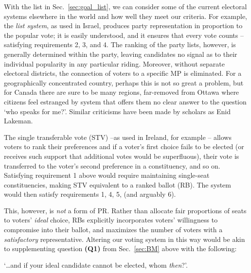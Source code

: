 With the list in Sec.~\ref{sec:goal_list}, we can consider some of the current electoral systems elsewhere in the world and how well they meet our criteria. For example, the \emph{list system}, as used in Israel, produces party representation in proportion to the popular vote; it is easily understood, and it ensures that every vote counts \---satisfying requirements 2, 3, and 4.
The ranking of the party lists, however, is generally determined within the party, leaving candidates no signal as to their individual popularity in any particular riding. Moreover, without separate electoral districts, the connection of voters to a specific MP is eliminated.
For a geographically concentrated country, perhaps this is not so great a problem, but for Canada there are sure to be many regions, far-removed from Ottawa where citizens feel estranged by system that offers them no clear answer to the question `who speaks for me?'. Similar criticisms have been made by scholars as Enid Lakeman\cite{Lakeman}.

The single transferable vote (STV) \---as used in Ireland, for example\cite{Irish_howto_vote_doc}
\--- allows voters to  rank their preferences and if a voter's first choice fails to be elected (or receives such support that additional votes would be superfluous), their vote is transferred to the voter's second preference in a constituency, and so on.
Satisfying requirement 1 above would require maintaining single-seat constituencies, making STV equivalent to a ranked ballot (RB). The system would then satisfy requirements 1, 4, 5, (and arguably 6).

This, however, is \emph{not} a form of PR.
Rather than allocate fair proportions of seats to voters' \emph{ideal} choice, RBs explicitly incorporates voters' willingness to compromise into their ballot, and maximizes the number of voters with a \emph{satisfactory} representative.
Altering our voting system in this way would be akin to supplementing question \textbf{(Q1)} from Sec.~\ref{sec:BM} above with the following:

\begin{tcolorbox}[colback=white!5!white,colframe=blue!55!black]
`\ldots and if your ideal candidate cannot be elected, whom \emph{then}?'.
\end{tcolorbox}

